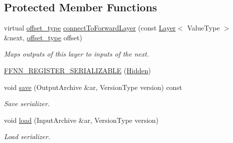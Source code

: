 \subsection*{Protected Member Functions}
\begin{DoxyCompactItemize}
\item 
virtual \hyperlink{namespaceffnn_add5752d74b38c6e9b200f3d696fc3ec8}{offset\-\_\-type} \hyperlink{classffnn_1_1layer_1_1_hidden_a850146834d054166b69309d093c650dd}{connect\-To\-Forward\-Layer} (const \hyperlink{classffnn_1_1layer_1_1_layer}{Layer}$<$ Value\-Type $>$ \&next, \hyperlink{namespaceffnn_add5752d74b38c6e9b200f3d696fc3ec8}{offset\-\_\-type} offset)
\begin{DoxyCompactList}\small\item\em Maps outputs of this layer to inputs of the next. \end{DoxyCompactList}\item 
\hyperlink{classffnn_1_1layer_1_1_hidden_a1f32376417e65ec5f06f360de38c8451}{F\-F\-N\-N\-\_\-\-R\-E\-G\-I\-S\-T\-E\-R\-\_\-\-S\-E\-R\-I\-A\-L\-I\-Z\-A\-B\-L\-E} (\hyperlink{classffnn_1_1layer_1_1_hidden}{Hidden})
\item 
void \hyperlink{classffnn_1_1layer_1_1_hidden_a1ef2b7dc49a809498125190628e672cf}{save} (Output\-Archive \&ar, Version\-Type version) const 
\begin{DoxyCompactList}\small\item\em Save serializer. \end{DoxyCompactList}\item 
void \hyperlink{classffnn_1_1layer_1_1_hidden_a94cba25f361e7077a3b7eb863d7d2f02}{load} (Input\-Archive \&ar, Version\-Type version)
\begin{DoxyCompactList}\small\item\em Load serializer. \end{DoxyCompactList}\end{DoxyCompactItemize}
